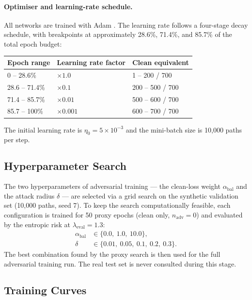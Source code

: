\paragraph{Optimiser and learning-rate schedule.}
All networks are trained with Adam \citep{kingma2015adam}.  The learning rate
follows a four-stage decay schedule, with breakpoints at approximately 28.6\%,
71.4\%, and 85.7\% of the total epoch budget:
\begin{center}
  \begin{tabular}{lll}
    \toprule
    Epoch range & Learning rate factor & Clean equivalent \\
    \midrule
    0 -- 28.6\% & $\times 1.0$   & 1 -- 200 / 700 \\
    28.6 -- 71.4\% & $\times 0.1$  & 200 -- 500 / 700 \\
    71.4 -- 85.7\% & $\times 0.01$ & 500 -- 600 / 700 \\
    85.7 -- 100\%  & $\times 0.001$& 600 -- 700 / 700 \\
    \bottomrule
  \end{tabular}
\end{center}
The initial learning rate is $\eta_0 = 5 \times 10^{-3}$ and the
mini-batch size is 10{,}000 paths per step.

\subsection{Hyperparameter Search}%
\label{sec:gad_hpsearch}

The two hyperparameters of adversarial training --- the clean-loss weight
$\alpha_{\mathrm{bal}}$ and the attack radius $\delta$ --- are selected
via a grid search on the synthetic validation set (10{,}000 paths, seed 7).
To keep the search computationally feasible, each configuration is trained for
50 proxy epochs (clean only, $n_{\mathrm{adv}} = 0$) and evaluated by the
entropic risk at $\lambda_{\mathrm{eval}} = 1.3$:
\begin{align*}
  \alpha_{\mathrm{bal}} &\in \{0.0,\ 1.0,\ 10.0\}, \\
  \delta &\in \{0.01,\ 0.05,\ 0.1,\ 0.2,\ 0.3\}.
\end{align*}
The best combination found by the proxy search is then used for the full
adversarial training run.  The real test set is never consulted during this
stage.

\subsection{Training Curves}

